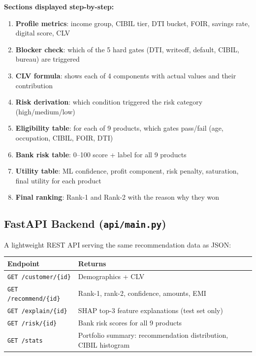 \documentclass[12pt,a4paper]{article}
\begin{document}
\textbf{Sections displayed step-by-step:}
\begin{enumerate}[leftmargin=*,itemsep=1pt]
  \item \textbf{Profile metrics}: income group, CIBIL tier, DTI bucket, FOIR, savings rate, digital score, CLV
  \item \textbf{Blocker check}: which of the 5 hard gates (DTI, writeoff, default, CIBIL, bureau) are triggered
  \item \textbf{CLV formula}: shows each of 4 components with actual values and their contribution
  \item \textbf{Risk derivation}: which condition triggered the risk category (high/medium/low)
  \item \textbf{Eligibility table}: for each of 9 products, which gates pass/fail (age, occupation, CIBIL, FOIR, DTI)
  \item \textbf{Bank risk table}: 0--100 score + label for all 9 products
  \item \textbf{Utility table}: ML confidence, profit component, risk penalty, saturation, final utility for each product
  \item \textbf{Final ranking}: Rank-1 and Rank-2 with the reason why they won
\end{enumerate}

\subsection{FastAPI Backend (\texttt{api/main.py})}

A lightweight REST API serving the same recommendation data as JSON:

\begin{tabular}{ll}
\toprule
\textbf{Endpoint} & \textbf{Returns} \\
\midrule
\texttt{GET /customer/\{id\}} & Demographics + CLV \\
\texttt{GET /recommend/\{id\}} & Rank-1, rank-2, confidence, amounts, EMI \\
\texttt{GET /explain/\{id\}}   & SHAP top-3 feature explanations (test set only) \\
\texttt{GET /risk/\{id\}}      & Bank risk scores for all 9 products \\
\texttt{GET /stats}             & Portfolio summary: recommendation distribution, CIBIL histogram \\
\bottomrule
\end{tabular}

\newpage
\end{document}
